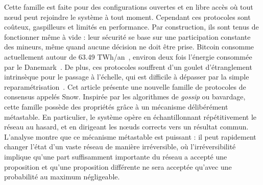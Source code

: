 \documentclass[letterpaper,twocolumn,10pt]{article}
\theoremstyle{definition}
\begin{document}
Cette famille est faite pour des configurations ouvertes et en libre accès où tout nœud peut rejoindre le système à tout moment.
Cependant ces protocoles sont coûteux, gaspilleurs et limités en performance.
Par construction, ils sont tenus de fonctionner même à vide : leur sécurité se base sur une participation constante des mineurs, même quand aucune décision ne doit être prise.
Bitcoin consomme actuellement autour de 63.49 TWh/an~\cite{bitcoinpower}, environ deux fois l'énergie consommée par le Danemark~\cite{denmarkpower}.
De plus, ces protocoles souffrent d'un goulet d'étranglement intrinsèque pour le passage à l'échelle, qui est difficile à dépasser par la simple reparamétrisation~\cite{CromanDEGJKMSSS16}.
Cet article présente une nouvelle famille de protocoles de consensus appelés Snow.
Inspirée par les algorithmes de \emph{gossip} ou bavardage, cette famille possède des propriétés grâce à un mécanisme délibérément métastable.
En particulier, le système opère en échantillonnant répétitivement le réseau au hasard, et en dirigeant les nœuds corrects vers un résultat commun.
L'analyse montre que ce mécanisme métastable est puissant : il peut rapidement changer l'état d'un vaste réseau de manière irréversible, où l'irréversibilité implique qu'une part suffisamment importante du réseau a accepté une proposition et qu'une proposition différente ne sera acceptée qu'avec une probabilité au maximum négligeable.
\end{document}
